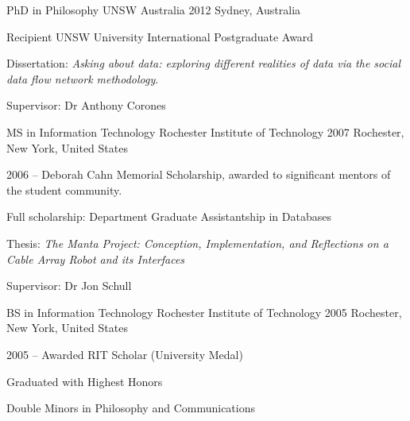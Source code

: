 

\begin{cventries}

  \cventry
    {PhD in Philosophy} %
    {UNSW Australia} %
    {2012} %
    {Sydney, Australia} %
    {
      \begin{cvitems} %
        \item {Recipient UNSW University International Postgraduate Award}
        \item {Dissertation: \textit{Asking about data: exploring different realities of data via the social data flow network methodology}.}
        \item {Supervisor: Dr Anthony Corones}
      \end{cvitems}
    }
 \cventry
    {MS in Information Technology} %
    {Rochester Institute of Technology} %
    {2007} %
    {Rochester, New York, United States} %
    {
      \begin{cvitems} %
        \item {2006 -- Deborah Cahn Memorial Scholarship, awarded to significant mentors of the student community.}
        \item {Full scholarship: Department Graduate Assistantship in Databases}
        \item {Thesis: \textit{The Manta Project: Conception, Implementation, and Reflections on a Cable Array Robot and its Interfaces}}
        \item {Supervisor: Dr Jon Schull}
      \end{cvitems}
    }
     \cventry
    {BS in Information Technology} %
    {Rochester Institute of Technology} %
    {2005} %
    {Rochester, New York, United States} %
    {
      \begin{cvitems} %
        \item {2005 -- Awarded RIT Scholar (University Medal)}
        \item {Graduated with Highest Honors}
        \item {Double Minors in Philosophy and Communications}
      \end{cvitems}
    }
\end{cventries}
